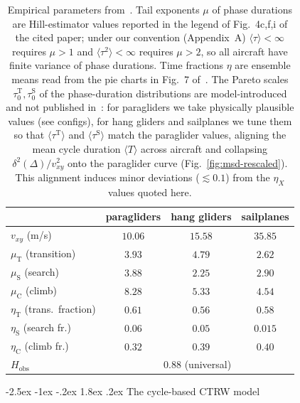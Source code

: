 \documentclass[11pt,a4paper]{article}
\makeatletter
\renewcommand\section{\@startsection{section}{1}{\z@}%
  {-2.5ex \@plus -1ex \@minus -.2ex}%
  {1.8ex \@plus.2ex}%
  {\normalfont\normalsize\bfseries\centering}}
\makeatother
\begin{document}
\begin{table}[!htbp]
\centering
\small
\begin{tabular}{lccc}
\hline\hline
 & paragliders & hang gliders & sailplanes \\
\hline
$v_{xy}$ (m/s)                  & $10.06$ & $15.58$ & $35.85$ \\
$\mu_{\mathrm{T}}$ (transition) & $3.93$  & $4.79$  & $2.62$ \\
$\mu_{\mathrm{S}}$ (search)     & $3.88$  & $2.25$  & $2.90$ \\
$\mu_{\mathrm{C}}$ (climb)      & $8.28$  & $5.33$  & $4.54$ \\
$\eta_{\mathrm{T}}$ (trans.\ fraction) & $0.61$ & $0.56$ & $0.58$ \\
$\eta_{\mathrm{S}}$ (search fr.)       & $0.06$ & $0.05$ & $0.015$ \\
$\eta_{\mathrm{C}}$ (climb fr.)        & $0.32$ & $0.39$ & $0.40$ \\
$H_{\mathrm{obs}}$ & \multicolumn{3}{c}{$0.88$ (universal)} \\
\hline\hline
\end{tabular}
\caption{Empirical parameters from~\cite{vilpellet2026}. Tail
exponents $\mu$ of phase durations are Hill-estimator values
reported in the legend of Fig.~4c,f,i of the cited paper; under
our convention (Appendix~A) $\langle \tau
\rangle<\infty$ requires $\mu>1$ and $\langle \tau^2\rangle<\infty$
requires $\mu>2$, so all aircraft have finite variance of phase
durations. Time fractions $\eta$ are ensemble means read from the
pie charts in Fig.~7 of~\cite{vilpellet2026}. The Pareto scales
$\tau_0^{\mathrm{T}}, \tau_0^{\mathrm{S}}$ of the phase-duration
distributions are model-introduced and not published
in~\cite{vilpellet2026}: for paragliders we take physically
plausible values (see configs), for hang gliders and sailplanes
we tune them so that $\langle\tau^{\mathrm{T}}\rangle$ and
$\langle\tau^{\mathrm{S}}\rangle$ match the paraglider values,
aligning the mean cycle duration $\langle T\rangle$ across
aircraft and collapsing $\delta^2(\Delta)/v_{xy}^2$ onto the
paraglider curve (Fig.~\ref{fig:msd-rescaled}). This alignment
induces minor deviations ($\lesssim 0.1$) from the $\eta_X$
values quoted here.}
\label{tab:params}
\end{table}

\section{The cycle-based CTRW model}
\label{sec:model}
\end{document}
